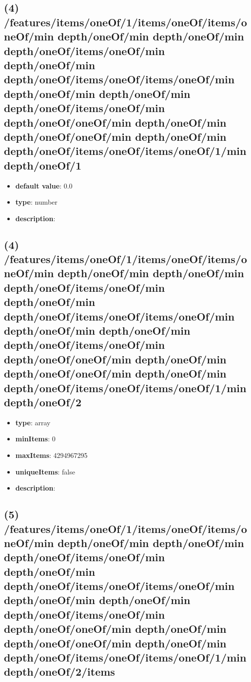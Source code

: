 \subsection{(4) /features/items/oneOf/1/items/oneOf/items/oneOf/min depth/oneOf/min depth/oneOf/min depth/oneOf/items/oneOf/min depth/oneOf/min depth/oneOf/items/oneOf/items/oneOf/min depth/oneOf/min depth/oneOf/min depth/oneOf/items/oneOf/min depth/oneOf/oneOf/min depth/oneOf/min depth/oneOf/oneOf/min depth/oneOf/min depth/oneOf/items/oneOf/items/oneOf/1/min depth/oneOf/1}
\begin{itemize}[leftmargin=4em]\item {\bf default value}: 0.0
\item {\bf type}: number
\item {\bf description}: 
\end{itemize}\subsection{(4) /features/items/oneOf/1/items/oneOf/items/oneOf/min depth/oneOf/min depth/oneOf/min depth/oneOf/items/oneOf/min depth/oneOf/min depth/oneOf/items/oneOf/items/oneOf/min depth/oneOf/min depth/oneOf/min depth/oneOf/items/oneOf/min depth/oneOf/oneOf/min depth/oneOf/min depth/oneOf/oneOf/min depth/oneOf/min depth/oneOf/items/oneOf/items/oneOf/1/min depth/oneOf/2}
\begin{itemize}[leftmargin=4em]\item {\bf type}: array
\item {\bf minItems}: 0
\item {\bf maxItems}: 4294967295
\item {\bf uniqueItems}: false
\item {\bf description}: 
\end{itemize}\subsection{(5) /features/items/oneOf/1/items/oneOf/items/oneOf/min depth/oneOf/min depth/oneOf/min depth/oneOf/items/oneOf/min depth/oneOf/min depth/oneOf/items/oneOf/items/oneOf/min depth/oneOf/min depth/oneOf/min depth/oneOf/items/oneOf/min depth/oneOf/oneOf/min depth/oneOf/min depth/oneOf/oneOf/min depth/oneOf/min depth/oneOf/items/oneOf/items/oneOf/1/min depth/oneOf/2/items}
